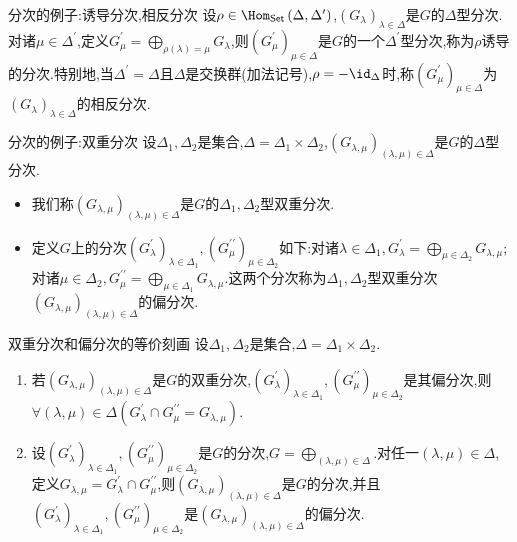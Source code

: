 \begin{example}{分次的例子:诱导分次,相反分次}{}
	设$\rho\in\Hom_{\mathsf{Set}}\left(\Delta,\Delta^{\prime}\right)$,$\left(G_{\lambda}\right)_{\lambda\in\Delta}$是$G$的$\Delta$型分次.对诸$\mu\in\Delta^{\prime}$,定义$G_{\mu}^{\prime}=\bigoplus\limits_{\rho\left(\lambda\right)=\mu}G_{\lambda}$,则$\left(G_{\mu}^{\prime}\right)_{\mu\in\Delta}$是$G$的一个$\Delta^{\prime}$型分次,称为$\rho$诱导的分次.特别地,当$\Delta^{\prime}=\Delta$且$\Delta$是交换群(加法记号),$\rho=-\id_{\Delta}$时,称$\left(G_{\mu}^{\prime}\right)_{\mu\in\Delta}$为$\left(G_{\lambda}\right)_{\lambda\in\Delta}$的相反分次.
\end{example}

\begin{example}{分次的例子:双重分次}{}
	设$\Delta_{1},\Delta_{2}$是集合,$\Delta=\Delta_{1}\times\Delta_{2}$,$\left(G_{\lambda,\mu}\right)_{\left(\lambda,\mu\right)\in\Delta}$是$G$的$\Delta$型分次.
	\begin{itemize}
		\item 我们称$\left(G_{\lambda,\mu}\right)_{\left(\lambda,\mu\right)\in\Delta}$是$G$的$\Delta_{1},\Delta_{2}$型双重分次.
		\item 定义$G$上的分次$\left(G_{\lambda}^{\prime}\right)_{\lambda\in\Delta_{1}},\left(G_{\mu}^{\prime\prime}\right)_{\mu\in\Delta_{2}}$如下:对诸$\lambda\in\Delta_{1},G_{\lambda}^{\prime}=\bigoplus\limits_{\mu\in\Delta_{2}}G_{\lambda,\mu}$;对诸$\mu\in\Delta_{2},G_{\mu}^{\prime\prime}=\bigoplus\limits_{\mu\in\Delta_{1}}G_{\lambda,\mu}$.这两个分次称为$\Delta_{1},\Delta_{2}$型双重分次$\left(G_{\lambda,\mu}\right)_{\left(\lambda,\mu\right)\in\Delta}$的偏分次.
	\end{itemize}
\end{example}

\begin{proposition}{双重分次和偏分次的等价刻画}{}
	设$\Delta_{1},\Delta_{2}$是集合,$\Delta=\Delta_{1}\times\Delta_{2}$.
	\begin{enumerate}
		\item 若$\left(G_{\lambda,\mu}\right)_{\left(\lambda,\mu\right)\in\Delta}$是$G$的双重分次,$\left(G_{\lambda}^{\prime}\right)_{\lambda\in\Delta_{1}},\left(G_{\mu}^{\prime\prime}\right)_{\mu\in\Delta_{2}}$是其偏分次,则$\forall\left(\lambda,\mu\right)\in\Delta\left(G_{\lambda}^{\prime}\cap G_{\mu}^{\prime\prime}=G_{\lambda,\mu}\right)$.
		\item 设$\left(G_{\lambda}^{\prime}\right)_{\lambda\in\Delta_{1}},\left(G_{\mu}^{\prime\prime}\right)_{\mu\in\Delta_{2}}$是$G$的分次,$G=\bigoplus\limits_{\left(\lambda,\mu\right)\in\Delta}$.对任一$\left(\lambda,\mu\right)\in\Delta$,定义$G_{\lambda,\mu}=G_{\lambda}^{\prime}\cap G_{\mu}^{\prime\prime}$,则$\left(G_{\lambda,\mu}\right)_{\left(\lambda,\mu\right)\in\Delta}$是$G$的分次,并且$\left(G_{\lambda}^{\prime}\right)_{\lambda\in\Delta_{1}},\left(G_{\mu}^{\prime\prime}\right)_{\mu\in\Delta_{2}}$是$\left(G_{\lambda,\mu}\right)_{\left(\lambda,\mu\right)\in\Delta}$的偏分次.
	\end{enumerate}
\end{proposition}

